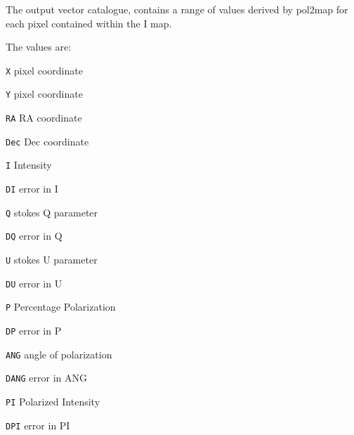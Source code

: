 The output vector catalogue, contains a range of values derived by pol2map for each pixel contained within the I map. 

The values are:

\begin{aligndesc}
\item[\texttt{X}] pixel coordinate
\item[\texttt{Y}] pixel coordinate
\item[\texttt{RA}] RA coordinate 
\item[\texttt{Dec}] Dec coordinate
\item[\texttt{I}] Intensity
\item[\texttt{DI}] error in I
\item[\texttt{Q}] stokes Q parameter
\item[\texttt{DQ}] error in Q
\item[\texttt{U}] stokes U parameter
\item[\texttt{DU}] error in U
\item[\texttt{P}] Percentage Polarization
\item[\texttt{DP}] error in P
\item[\texttt{ANG}] angle of polarization
\item[\texttt{DANG}] error in ANG
\item[\texttt{PI}] Polarized Intensity
\item[\texttt{DPI}] error in PI
\end{aligndesc}



